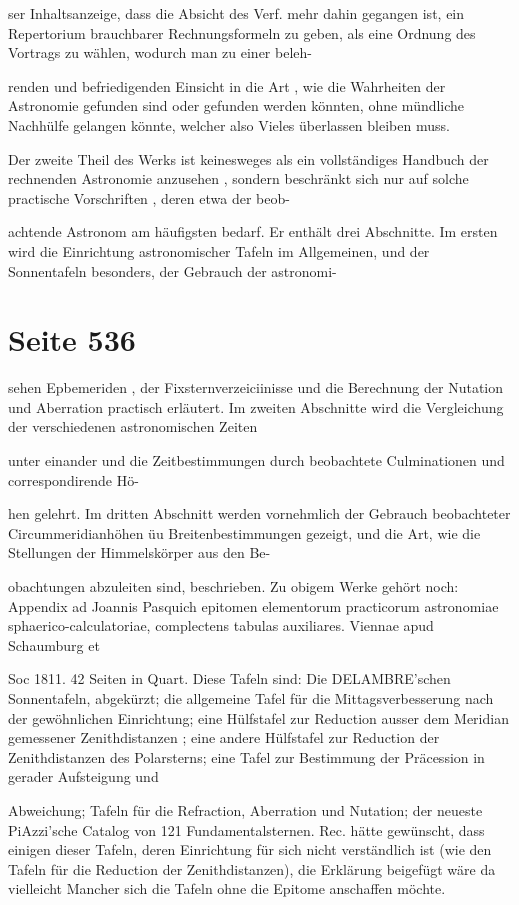 \documentclass[10pt,a4paper]{article}
\begin{document}
ser Inhaltsanzeige, dass die Absicht des Verf. mehr dahin gegangen ist, ein Repertorium brauchbarer Rechnungsformeln zu geben, als eine Ordnung des Vortrags zu wählen, wodurch man zu einer beleh-

renden und befriedigenden Einsicht in die Art , wie die Wahrheiten der Astronomie gefunden sind oder gefunden werden könnten, ohne mündliche Nachhülfe gelangen könnte, welcher also Vieles überlassen bleiben muss.

Der zweite Theil des Werks ist keinesweges als ein vollständiges Handbuch der rechnenden Astronomie anzusehen , sondern beschränkt sich nur auf solche practische Vorschriften , deren etwa der beob-

achtende Astronom am häufigsten bedarf. Er enthält drei Abschnitte. Im ersten wird die Einrichtung astronomischer Tafeln im Allgemeinen, und der Sonnentafeln besonders, der Gebrauch der astronomi-


\newpage
\section*{Seite 536}
sehen Epbemeriden , der Fixsternverzeiciinisse und die Berechnung der Nutation und Aberration practisch erläutert. Im zweiten Abschnitte wird die Vergleichung der verschiedenen astronomischen Zeiten

unter einander und die Zeitbestimmungen durch beobachtete Culminationen und correspondirende Hö-

hen gelehrt. Im dritten Abschnitt werden vornehmlich der Gebrauch beobachteter Circummeridianhöhen üu Breitenbestimmungen gezeigt, und die Art, wie die Stellungen der Himmelskörper aus den Be-

obachtungen abzuleiten sind, beschrieben. Zu obigem Werke gehört noch: Appendix ad Joannis Pasquich epitomen elementorum practicorum astronomiae sphaerico-calculatoriae, complectens tabulas auxiliares. Viennae apud Schaumburg et

Soc 1811. 42 Seiten in Quart. Diese Tafeln sind: Die DELAMBRE'schen Sonnentafeln, abgekürzt; die allgemeine Tafel für die Mittagsverbesserung nach der gewöhnlichen Einrichtung; eine Hülfstafel zur Reduction ausser dem Meridian gemessener Zenithdistanzen ; eine andere Hülfstafel zur Reduction der Zenithdistanzen des Polarsterns; eine Tafel zur Bestimmung der Präcession in gerader Aufsteigung und

Abweichung; Tafeln für die Refraction, Aberration und Nutation; der neueste PiAzzi'sche Catalog von 121 Fundamentalsternen. Rec. hätte gewünscht, dass einigen dieser Tafeln, deren Einrichtung für sich nicht verständlich ist (wie den Tafeln für die Reduction der Zenithdistanzen), die Erklärung beigefügt wäre da vielleicht Mancher sich die Tafeln ohne die Epitome anschaffen möchte.
\end{document}
